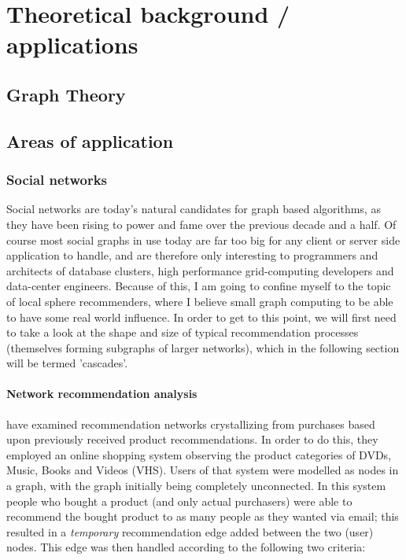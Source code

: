 \chapter{Theoretical background / applications}
\label{ch:applications}


\section{Graph Theory}
\label{sect:graph_theory}


\section{Areas of application}
\label{sect:app_areas}

	\subsection{Social networks}
	\label{ssect:social_networks}
	
	Social networks are today's natural candidates for graph based algorithms, as they have been rising to power and fame over the previous decade and a half. Of course most social graphs in use today are far too big for any client or server side application to handle, and are therefore only interesting to programmers and architects of database clusters, high performance grid-computing developers and data-center engineers. Because of this, I am going to confine myself to the topic of local sphere recommenders, where I believe small graph computing to be able to have some real world influence. In order to get to this point, we will first need to take a look at the shape and size of typical recommendation processes (themselves forming subgraphs of larger networks), which in the following section will be termed 'cascades'.
	
	
	\subsubsection{Network recommendation analysis}
	\label{sssect:net_rec_anal}
	
	\citet{RecCascades} have examined recommendation networks crystallizing from purchases based upon previously received product recommendations. In order to do this, they employed an online shopping system observing the product categories of DVDs, Music, Books and Videos (VHS). Users of that system were modelled as nodes in a graph, with the graph initially being completely unconnected. In this system people who bought a product (and only actual purchasers) were able to recommend the bought product to as many people  as they wanted via email; this resulted in a \textit{temporary} recommendation edge added between the two (user) nodes. This edge was then handled according to the following two criteria:
	
